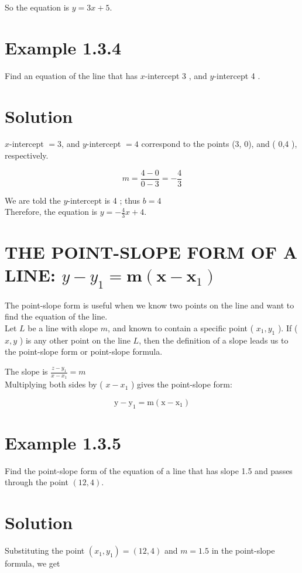 So the equation is $y=3 x+5$.

\section*{Example 1.3.4}
Find an equation of the line that has $x$-intercept 3 , and $y$-intercept 4 .

\section*{Solution}
$x$-intercept $=3$, and $y$-intercept $=4$ correspond to the points (3, 0), and ( 0,4 ), respectively.

$$
m=\frac{4-0}{0-3}=-\frac{4}{3}
$$

We are told the $y$-intercept is 4 ; thus $b=4$\\
Therefore, the equation is $y=-\frac{4}{3} x+4$.

\section*{THE POINT-SLOPE FORM OF A LINE: $y-y_{1}=\boldsymbol{m}\left(\boldsymbol{x}-\boldsymbol{x}_{1}\right)$}
The point-slope form is useful when we know two points on the line and want to find the equation of the line.\\
Let $L$ be a line with slope $m$, and known to contain a specific point ( $x_{1}, y_{1}$ ). If ( $x, y$ ) is any other point on the line $L$, then the definition of a slope leads us to the point-slope form or point-slope formula.

The slope is $\frac{z-y_{1}}{x-x_{1}}=m$\\
Multiplying both sides by ( $x-x_{1}$ ) gives the point-slope form:

$$
\mathrm{y}-\mathrm{y}_{1}=\mathrm{m}\left(\mathrm{x}-\mathrm{x}_{1}\right)
$$

\section*{Example 1.3.5}
Find the point-slope form of the equation of a line that has slope 1.5 and passes through the point $(12,4)$.

\section*{Solution}
Substituting the point $\left(x_{1}, y_{1}\right)=(12,4)$ and $m=1.5$ in the point-slope formula, we get

